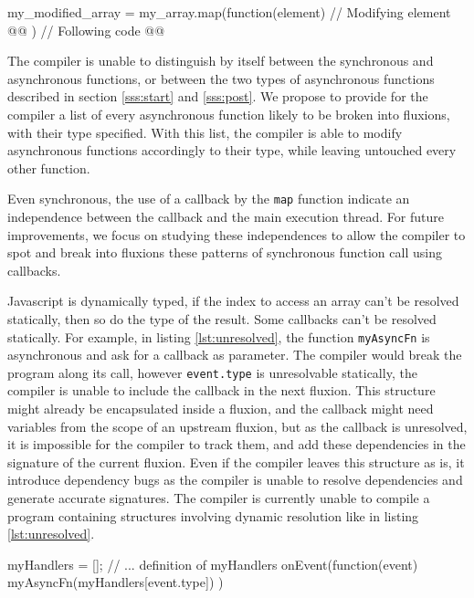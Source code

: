 \begin{code}[Javascript, caption={Example of a synchronous function using a callback},label={lst:array}]
  my_modified_array = my_array.map(function(element) {
    // Modifying element @@
  })
  // Following code @@
\end{code}

The compiler is unable to distinguish by itself between the synchronous and asynchronous functions, or between the two types of asynchronous functions described in section \ref{sss:start} and \ref{sss:post}.
We propose to provide for the compiler a list of every asynchronous function likely to be broken into fluxions, with their type specified.
With this list, the compiler is able to modify asynchronous functions accordingly to their type, while leaving untouched every other function.

Even synchronous, the use of a callback by the \texttt{map} function indicate an independence between the callback and the main execution thread.
For future improvements, we focus on studying these independences to allow the compiler to spot and break into fluxions these patterns of synchronous function call using callbacks.


Javascript is dynamically typed, if the index to access an array can't be resolved statically, then so do the type of the result.
Some callbacks can't be resolved statically.
For example, in listing \ref{lst:unresolved}, the function \texttt{myAsyncFn} is asynchronous and ask for a callback as parameter.
The compiler would break the program along its call, however \texttt{event.type} is unresolvable statically, the compiler is unable to include the callback in the next fluxion.
This structure might already be encapsulated inside a fluxion, and the callback might need variables from the scope of an upstream fluxion, but as the callback is unresolved, it is impossible for the compiler to track them, and add these dependencies in the signature of the current fluxion.
Even if the compiler leaves this structure as is, it introduce dependency bugs as the compiler is unable to resolve dependencies and generate accurate signatures.
The compiler is currently unable to compile a program containing structures involving dynamic resolution like in listing \ref{lst:unresolved}.

\begin{code}[Javascript, caption={Example of an unresolvable callback},label={lst:unresolved}]
myHandlers = [];
// ... definition of myHandlers
onEvent(function(event) {
  myAsyncFn(myHandlers[event.type])
})
\end{code}

